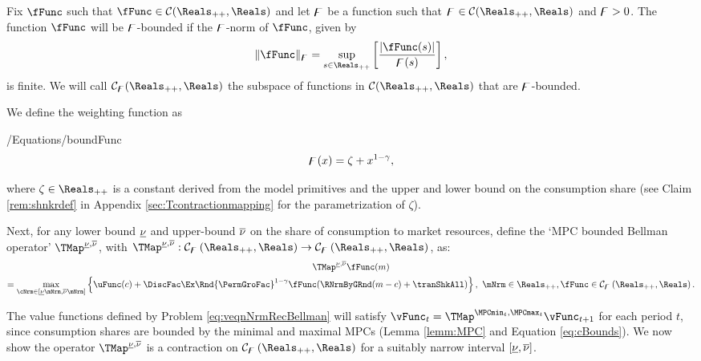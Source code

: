 \documentclass[\econtexRoot/BufferStockTheory]{subfiles}
\begin{document}
\begin{definition}\label{def:boundfuncspace}
  Fix $\fFunc$ such that $\fFunc \in \mathcal{C}(\Reals_{++},\Reals)$ and let $\digamma$ be a function such that $\boundFunc\in \mathcal{C}(\Reals_{++},\Reals)$ and $\digamma >0$. The function $\fFunc$ will be $\digamma$-bounded if the $\digamma$-norm of $\fFunc$, given by
  \begin{equation}
    \Vert \fFunc\Vert _{\boundFunc }=\sup_{s\in \Reals_{++}}\left[ \frac{|\fFunc(s)|}{\boundFunc (s)}\right],
    \label{eq:phinorm}
  \end{equation}%
  is finite.
We will call $\mathcal{C}_{\boundFunc}(\Reals_{++},\Reals)$ the subspace of functions in $\mathcal{C}(\Reals_{++},\Reals)$ that are $\digamma$-bounded.
\end{definition}

We define the weighting function as
%
\begin{verbatimwrite}{\econtexRoot/Equations/boundFunc}
\begin{equation}
\digamma(x) = \zeta + x^{1-\gamma},
\end{equation}
\end{verbatimwrite} \unskip

where $\zeta \in \Reals_{++}$ is a constant derived from the model primitives and the upper and lower bound on the consumption share (see Claim \ref{rem:shnkrdef} in Appendix \ref{sec:Tcontractionmapping} for the parametrization of $\zeta$).
  
Next, for any lower bound $\underline{\nu}$ and upper-bound $\overline{\nu}$ on the share of consumption to market resources, define the `MPC bounded Bellman operator' $\TMap^{\MPCminInf, \MPCmaxInf}$, with \textit{$\TMap^{\MPCminInf, \MPCmaxInf}:\mathcal{C}_{\boundFunc }\left( \Reals_{++},\Reals\right) \rightarrow \mathcal{C}_{\boundFunc }\left( \Reals_{++},\Reals\right) $}, as:
%
\begin{multline}
\TMap^{\MPCminInf, \MPCmaxInf} \fFunc(m) \\  = \max_{\cNrm \in
    [\MPCminInf \mNrm, \MPCmaxInf \mNrm]
  }  \left\{\uFunc(c) + \DiscFac\Ex\Rnd{\PermGroFac}^{1-\CRRA}\fFunc(\RNrmByGRnd(m - c) + \tranShkAll)\right\}, \,\,  \mNrm\in \Reals_{++}, \fFunc\in \mathcal{C}_{\boundFunc }\left(\Reals_{++},\Reals\right).
\end{multline}

The value functions defined by Problem \eqref{eq:veqnNrmRecBellman} will satisfy  $\vFunc_{t} = \TMap^{\MPCmin_{t}, \MPCmax_{t}}\vFunc_{t+1}$ for each period $t$, since consumption shares are bounded by the minimal and maximal MPCs (Lemma \ref{lemm:MPC} and Equation \eqref{eq:cBounds}).
We now show the operator $\TMap^{\MPCminInf, \MPCmaxInf}$ is a contraction on $\mathcal{C}_{\boundFunc }\left( \Reals_{++},\Reals\right)$ for a suitably narrow interval $[\underline{\nu}, \overline{\nu}]$.
\end{document}
